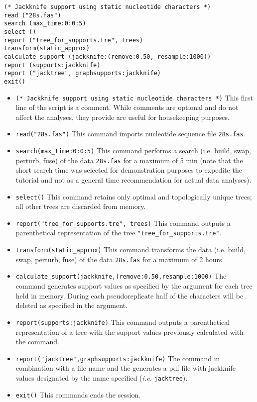 \begin{verbatim}
(* Jackknife support using static nucleotide characters *)
read ("28s.fas")
search (max_time:0:0:5)
select ()
report ("tree_for_supports.tre", trees)
transform(static_approx)
calculate_support (jackknife:(remove:0.50, resample:1000))
report (supports:jackknife)
report ("jacktree", graphsupports:jackknife)
exit()
\end{verbatim}
\begin{itemize}
\item \texttt{(* Jackknife support using static nucleotide characters *)} This first line of the script is a comment. While comments are optional and do not affect the analyses, they provide are useful for housekeeping purposes.
\item \texttt{read("28s.fas")} This command imports nucleotide sequence file \texttt{28s.fas}.
\item \texttt{search(max\_time:0:0:5)} This command performs a search (i.e. build, swap, perturb, fuse) of the data \texttt{28s.fas} for a maximum of 5 min (note that the short search time was selected for demonstration purposes to expedite the tutorial and not as a general time recommendation for actual data analyses).   
\item \texttt{select()} This command retains only optimal and topologically unique trees; all other trees are discarded from memory. 
\item \texttt{report("tree\_for\_supports.tre", trees)}  This command outputs a parenthetical representation of the tree \texttt{"tree\_for\_supports.tre"}.
\item \texttt{transform(static\_approx)} This command transforms the data (i.e. build, swap, perturb, fuse) of the data \texttt{28s.fas} for a maximum of 2 hours.
\item \texttt{calculate\_support(jackknife,(remove:0.50,resample:1000)} The  command generates support values as specified by the  argument for each tree held in memory. During each pseudoreplicate half of the characters will be deleted as specified in the argument. 
\item \texttt{report(supports:jackknife)}  This command outputs a parenthetical representation of a tree with the support values previously calculated with the  command. 
\item \texttt{report("jacktree",graphsupports:jackknife)}  The  command in combination with a file name and the  generates a pdf file with jackknife values designated by the name specified (\emph{i.e.} \texttt{jacktree}). 
\item \texttt{exit()} This commands ends the \poy session.
\end{itemize}

